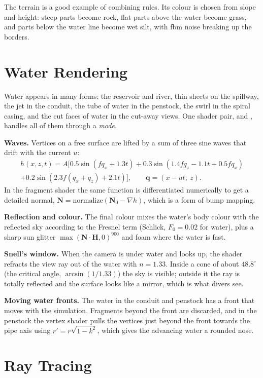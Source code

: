 \documentclass[11pt,a4paper]{report}
\newcommand{\code}[1]{\texttt{\detokenize{#1}}}
\newcommand{\vect}[1]{\mathbf{#1}}
\begin{document}
The terrain is a good example of combining rules. Its colour is chosen from slope and
height: steep parts become rock, flat parts above the water become grass, and parts
below the water line become wet silt, with fbm noise breaking up the borders.

\section{Water Rendering}

Water appears in many forms: the reservoir and river, thin sheets on the spillway,
the jet in the conduit, the tube of water in the penstock, the swirl in the spiral
casing, and the cut faces of water in the cut-away views. One shader pair,
\code{water.vert} and \code{water.frag}, handles all of them through a \emph{mode}.

\textbf{Waves.} Vertices on a free surface are lifted by a sum of three sine waves
that drift with the current $u$:
\begin{multline}
h(x,z,t) = A\big[0.5\sin(f q_x + 1.3t) + 0.3\sin(1.4 f q_z - 1.1t + 0.5 f q_x)\\
 + 0.2\sin(2.3 f (q_x+q_z) + 2.1t)\big],\qquad \vect{q} = (x - ut,\ z).
\end{multline}
In the fragment shader the same function is differentiated numerically to get a
detailed normal, $\vect{N} = \text{normalize}(\vect{N}_0 - \nabla h)$, which is a form
of bump mapping.

\textbf{Reflection and colour.} The final colour mixes the water's body colour with
the reflected sky according to the Fresnel term (Schlick, $F_0 = 0.02$ for water),
plus a sharp sun glitter $\max(\vect{N}\cdot\vect{H},0)^{900}$ and foam where the water
is fast.

\textbf{Snell's window.} When the camera is under water and looks up, the shader
refracts the view ray out of the water with $n = 1.33$. Inside a cone of about
$48.8^\circ$ (the critical angle, $\arcsin(1/1.33)$) the sky is visible; outside it the ray is totally reflected and the surface
looks like a mirror, which is what divers see.

\textbf{Moving water fronts.} The water in the conduit and penstock has a front that
moves with the simulation. Fragments beyond the front are discarded, and in the
penstock the vertex shader pulls the vertices just beyond the front towards the pipe
axis using $r' = r\sqrt{1-k^2}$, which gives the advancing water a rounded nose.

\section{Ray Tracing}
\label{sec:rt}
\end{document}
